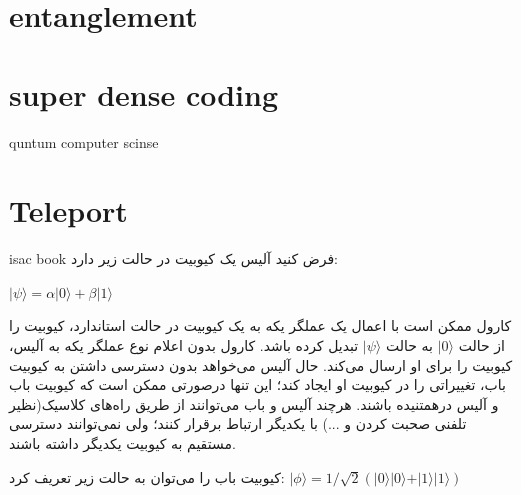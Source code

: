 \documentclass{book}
\begin{document}
\section{entanglement}
\section{super dense coding}
quntum computer scinse
\section{Teleport}
isac book
فرض کنید آلیس یک کیوبیت در حالت زیر دارد:
\begin{center}
$\vert \psi \rangle = \alpha\vert 0 \rangle + \beta\vert 1 \rangle $\\	
\end{center}

	کارول ممکن است با اعمال یک عملگر یکه‌ به یک کیوبیت در حالت استاندارد، کیوبیت را از حالت $\vert0\rangle$ به حالت $\vert\psi\rangle$  تبدیل کرده باشد. کارول بدون اعلام نوع عملگر یکه به آلیس،‌ کیوبیت را برای او ارسال می‌کند. 
	حال آلیس می‌خواهد بدون دسترسی داشتن به کیوبیت باب، تغییراتی را در کیوبیت او ایجاد کند؛ این تنها درصورتی ممکن است که کیوبیت باب و آلیس درهمتنیده باشند. هرچند آلیس و باب می‌توانند از طریق راه‌های کلاسیک(نظیر تلفنی صحبت کردن و ...) با یکدیگر ارتباط برقرار کنند؛ ولی نمی‌توانند دسترسی مستقیم به کیوبیت یکدیگر داشته باشند. 
	
	کیوبیت باب را می‌توان به حالت زیر تعریف کرد:
$\vert\phi\rangle = 1/\sqrt{2}(\vert0\rangle \vert0\rangle + \vert1\rangle\vert1\rangle)$ 
	
\end{document}
